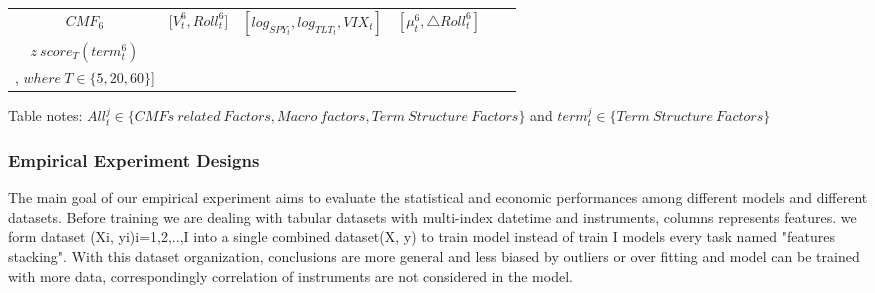 \documentclass[10pt,letterpaper]{article}
\begin{document}
\begin{sidewaystable}
\begin{tabular}{|c|c|c|c|c|c|}
    \hline
    \(CMF_{6}\) & \({[V_{t}^6},{Roll_{t}^6]}\) & \([log_{SPY_t},log_{TLT_t},VIX_t]\) & \({[\mu_{t}^6, \triangle Roll_{t}^6]}\) & \makecell[c]{\([Std_{T}(All_{t}^{6}), Skew_{T}^{6}(All_{t}^{6}),Kurt_T(All_{t}^{6}),Mean_{T}(All_{t}^{6})\),\\ \(z\ score_{T}(term_{t}^{6})\)\\ , \(where \: T \in \{5,20, 60\}\)]}  \\
    \hline %
\end{tabular}
\begin{flushleft} Table notes: \( All_{t}^{j} \in \{CMFs\ related \ Factors, Macro \ factors, Term\ Structure\ Factors\}\) and \(term_{t}^{j} \in \{Term\ Structure\ Factors \}\)

\end{flushleft}
\label{table1}
\end{sidewaystable}

 \subsubsection*{Empirical Experiment Designs}
 The main goal of our empirical experiment aims to evaluate the statistical and economic performances among different models and different datasets.
Before training we are dealing with tabular datasets with multi-index datetime and instruments, columns represents features. we form dataset {(Xi, yi)}i=1,2,..,I into a single combined dataset(X, y) to train model instead of train I models every task named "features stacking". With this dataset organization, conclusions are more general and less biased by outliers or over fitting and model can be trained with more data, correspondingly correlation of instruments are not considered in the model.
\end{document}
